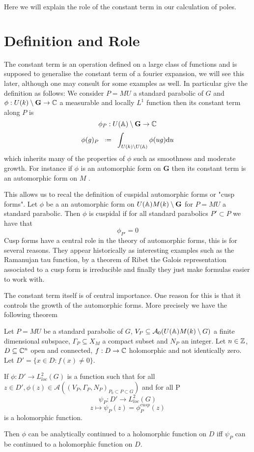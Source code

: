 Here we will explain the role of the constant term in our calculation of poles.

\section{Definition and Role}
The constant term is an operation defined on a large class of functions and is supposed to generalise the constant term of a fourier expansion, we will see this later, although one may consult \cite[1.6]{bumpAutomorphicFormsRepresentations1997} for some examples as well. In particular \cite[I.2.6]{moeglinSpectralDecompositionEisenstein1995} give the definition as follows: We consider \(P=MU\) a standard parabolic of \(G\) and \(\phi: U(k)\setminus \mathbf{G} \to \C\) a measurable and locally \(L^1\) function then its constant term along \(P\) is 
\[\phi_P :  U(\A)\setminus \mathbf{G} \to \C\]
\[\phi(g)_P \defeq \int_{U(k)\setminus U(\A)}\phi(ug) \mathrm{d}u\]
which inherits many of the properties of \(\phi\) such as smoothness and moderate growth. For instance if \(\phi\) is an automorphic form on \(\mathbf{G}\) then its constant term is an automorphic form on \(M\) \cite[6.5]{getzIntroductionAutomorphicRepresentations2024}.

This allows us to recal the definition of cuspidal automorphic forms or "cusp forms". Let \(\phi\) be a an automorphic form on \(U(\A)M(k)\setminus \mathbf{G}\) for \(P = MU\) a standard parabolic. Then \(\phi\) is cuspidal if for all standard parabolics \(P'\subset P\) we have that 
\[\phi_{P'} = 0\]
Cusp forms have a central role in the theory of automorphic forms, this is for several reasons. They appear historically as interesting examples such as the Ramanujan tau function, by a theorem of Ribet \cite[T2.3]{serreProceedingsInternationalConference1977} the Galois representation associated to a cusp form is irreducible and finally they just make formulas easier to work with.

The constant term itself is of central importance. One reason for this is that it controls the growth of the automorphic forms. More precisely we have the following theorem \cite[I.4.10]{moeglinSpectralDecompositionEisenstein1995}

\begin{Theorem}
        Let \(P = MU\) be a standard parabolic of \(G\), \(V_P\subseteq \mathcal{A}_0(U(\A)M(k)\setminus G)\) a finite dimensional subspace, \(\Gamma_P\subseteq X_M\) a compact subset and \(N_P\) an integer. Let \(n\in \Z\), \(D\subseteq \C^n\) open and connected, \(f: D\to \C\) holomorphic and not identically zero. Let \(D' = \{x\in D : f(x)\neq 0\}\).

        If \(\phi: D' \to L^2_{loc}(G)\) is a function such that for all \(z\in D', \phi(z)\in \mathcal{A}((V_P, \Gamma_P, N_P)_{P_0\subset P \subset G})\) and for all P 
        \[\psi_P: D' \to L^2_{loc}(G)\]
        \[z \mapsto \psi_P(z) = \phi_P^{cusp}(z)\]
        is a holomorphic function. 

        Then \(\phi\) can be analytically continued to a holomorphic function on \(D\) iff \(\psi_P\) can be continued to a holomorphic function on \(D\).
    \end{Theorem}
    
